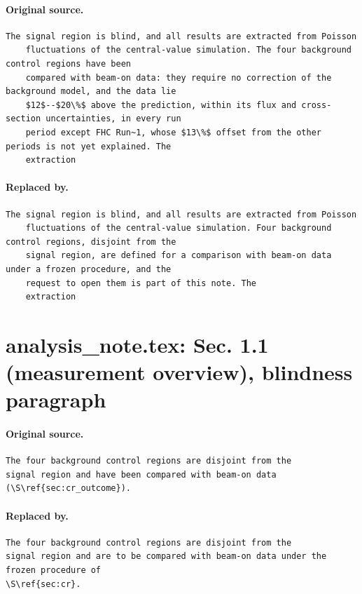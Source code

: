 \documentclass[11pt,a4paper]{article}
\begin{document}
\paragraph{Original source.}
\begin{lstlisting}[language={[LaTeX]TeX},basicstyle=\ttfamily\footnotesize,columns=fullflexible]
    The signal region is blind, and all results are extracted from Poisson
    fluctuations of the central-value simulation. The four background control regions have been
    compared with beam-on data: they require no correction of the background model, and the data lie
    $12$--$20\%$ above the prediction, within its flux and cross-section uncertainties, in every run
    period except FHC Run~1, whose $13\%$ offset from the other periods is not yet explained. The
    extraction
\end{lstlisting}
\paragraph{Replaced by.}
\begin{lstlisting}[language={[LaTeX]TeX},basicstyle=\ttfamily\footnotesize,columns=fullflexible]
    The signal region is blind, and all results are extracted from Poisson
    fluctuations of the central-value simulation. Four background control regions, disjoint from the
    signal region, are defined for a comparison with beam-on data under a frozen procedure, and the
    request to open them is part of this note. The
    extraction
\end{lstlisting}

\section{analysis\_note.tex: Sec. 1.1 (measurement overview), blindness paragraph}
\paragraph{Original source.}
\begin{lstlisting}[language={[LaTeX]TeX},basicstyle=\ttfamily\footnotesize,columns=fullflexible]
The four background control regions are disjoint from the
signal region and have been compared with beam-on data (\S\ref{sec:cr_outcome}).
\end{lstlisting}
\paragraph{Replaced by.}
\begin{lstlisting}[language={[LaTeX]TeX},basicstyle=\ttfamily\footnotesize,columns=fullflexible]
The four background control regions are disjoint from the
signal region and are to be compared with beam-on data under the frozen procedure of
\S\ref{sec:cr}.
\end{lstlisting}
\end{document}
